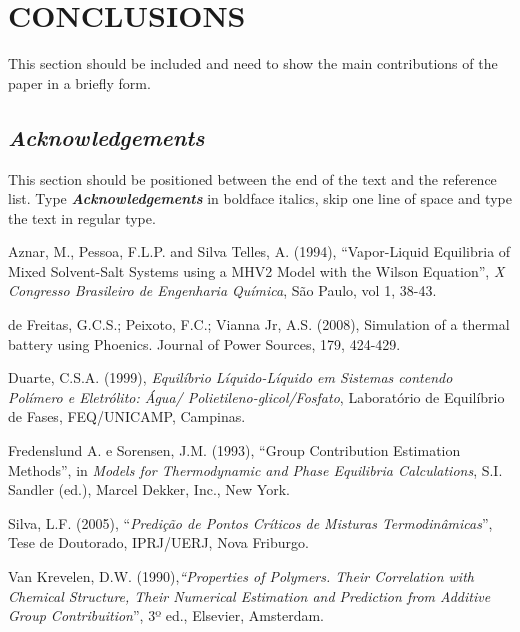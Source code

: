 \documentclass[12pt,fleqn]{article}
\begin{document}
\section{CONCLUSIONS}
This section should be included and need to show the main contributions of the paper in a briefly form.

\subsection*{\textit{Acknowledgements}}
This section should be positioned between the end of the text and the reference list. Type \textbf{\textit{Acknowledgements}} in boldface italics, skip one line of space and type the text in regular type.


\begin{thebibliography}{99}
\fontsize{11}{0}\selectfont
{}
Aznar, M., Pessoa, F.L.P. and Silva Telles, A. (1994), ``Vapor-Liquid Equilibria of Mixed Solvent-Salt Systems using a MHV2 Model with the Wilson Equation'', {\em X Congresso Brasileiro de Engenharia Química}, São Paulo, vol 1, 38-43.

de Freitas, G.C.S.; Peixoto, F.C.; Vianna Jr, A.S. (2008), Simulation of a thermal battery using Phoenics. Journal of Power Sources, 179, 424-429. 

Duarte, C.S.A. (1999), {\em Equilíbrio Líquido-Líquido em Sistemas contendo Polímero e Eletrólito: Água/ Polietileno-glicol/Fosfato}, Laboratório de Equilíbrio de Fases, FEQ/UNICAMP, Campinas.

Fredenslund A. e Sorensen, J.M. (1993), ``Group Contribution Estimation Methods'', in {\em  Models for Thermodynamic and Phase Equilibria Calculations}, S.I. Sandler (ed.), Marcel Dekker, Inc., New York.

Silva, L.F. (2005), ``{\em Predição de Pontos Críticos de Misturas Termodinâmicas}'', Tese de Doutorado, IPRJ/UERJ, Nova Friburgo.

Van Krevelen, D.W. (1990),{\em ``Properties of Polymers. Their Correlation with Chemical Structure, Their Numerical Estimation and Prediction from Additive Group Contribuition}'', 3º ed., Elsevier, Amsterdam.
\end{thebibliography}
\vspace*{-0.1cm}
\end{document}
